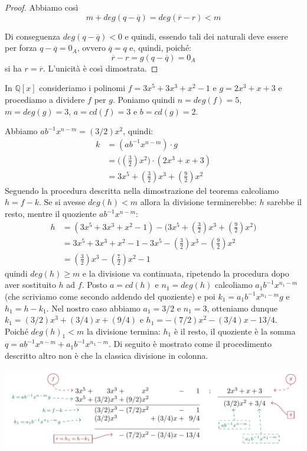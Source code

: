 \begin{proof}
	Abbiamo così $$m+deg (q-\overline{q})=deg (\overline{r}-r)<m$$
	
	Di conseguenza $deg(q - \overline{q})<0$ e quindi, essendo tali dei naturali deve essere per forza $q -\overline{q}=0_{A}$, ovvero $\overline{q}=q$ e, quindi, poiché: $$\overline{r}-r=g(q-\overline{q})=0_{A}$$ si ha $r=\overline{r}$. L'unicità è così dimostrata. 
\end{proof}

\begin{example}
	In $\mathbb{Q}[x]$ consideriamo i polinomi $f=3x^{5}+3x^{3}+x^{2}-1$ e $g=2x^{3}+x+3$ e procediamo a dividere $f$ per $g$. Poniamo quindi $n = deg(f) = 5$, $m= deg(g)=3$, $a=cd(f)= 3$ e $b=cd(g) = 2$.
	\medskip
	
	Abbiamo $ab^{-1}x^{n-m}=(3/2)x^{2}$, quindi:
	\begin{align*}
		k &= (ab^{-1}x^{n-m}) \cdot g\\
		&= \bigl((\frac{3}{2})x^{2}\bigr) \cdot (2x^{3}+x+3)\\
		&= 3x^{5} + (\frac{3}{2})x^{3}+(\frac{9}{2})x^{2}
	\end{align*}
	Seguendo la procedura descritta nella dimostrazione del teorema calcoliamo $h=f-k$. Se si avesse $deg(h) < m$ allora la divisione terminerebbe: $h$ sarebbe il resto, mentre il quoziente $ab^{-1}x^{n-m}$:
	\begin{align*}
		h &= (3x^{5}+3x^{3}+x^{2}-1) - \bigl(3x^{5} + (\frac{3}{2})x^{3}+(\frac{9}{2})x^{2}\bigr)\\
		&= 3x^{5}+3x^{3}+x^{2}-1 - 3x^{5} - (\frac{3}{2})x^{3} -(\frac{9}{2})x^{2} \\
		&=(\frac{3}{2})x^{3} - (\frac{7}{2})x^{2} -1
	\end{align*}
	quindi $deg(h) \geq m$ e la divisione va continuata, ripetendo la procedura dopo aver sostituito $h$ ad $f$. Posto $a=cd(h)$ e $n_{1}= deg(h)$ calcoliamo $a_{1}b^{-1}x^{n_{1}-m}$ (che scriviamo come secondo addendo del quoziente) e poi $k_{1}= a_{1}b^{-1}x^{n_{1}-m}g$ e $h_{1}=h-k_{1}$. Nel nostro caso abbiamo $a_{1}=3/2$ e $n_{1}=3$, otteniamo dunque $k_{1}=(3/2)x^{3}+(3/4)x+(9/4)$ e $h_{1}=-(7/2)x^{2}-(3/4)x-13/4$. Poiché $deg(h)_{1} < m$ la divisione termina: $h_{1}$ è il resto, il quoziente è la somma $q= ab^{-1}x^{n-m}+a_{1}b^{-1}x^{n_{1}-m}$. Di seguito è mostrato come il procedimento descritto altro non è che la classica divisione in colonna.
	
	\begin{center}
		\includegraphics[scale=.4]{res/divisione_polinomiale}
	\end{center}
	
\end{example}

